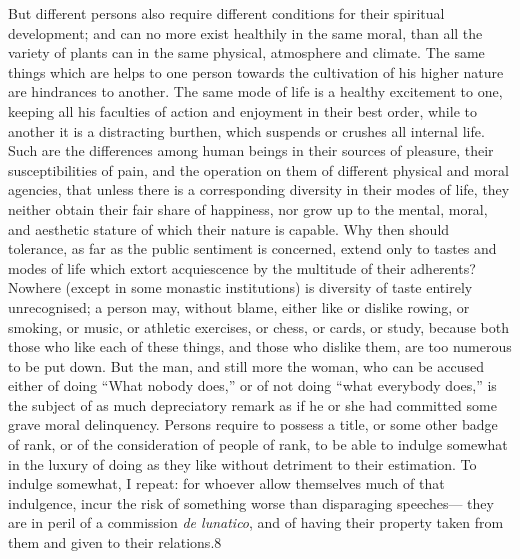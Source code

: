 \documentclass[11pt,openany]{book}
\begin{document}
But different persons also require different conditions for their spiritual development; and can no more exist healthily in the same moral, than all the variety of plants can in the same physical, atmosphere and climate. The same things which are helps to one person towards the cultivation of his higher nature are hindrances to another. The same mode of life is a healthy excitement to one, keeping all his faculties of action and enjoyment in their best order, while to another it is a distracting burthen, which suspends or crushes all internal life. Such are the differences among human beings in their sources of pleasure, their susceptibilities of pain, and the operation on them of different physical and moral agencies, that unless there is a corresponding diversity in their modes of life, they neither obtain their fair share of happiness, nor grow up to the mental, moral, and aesthetic stature of which their nature is capable. Why then should tolerance, as far as the public sentiment is concerned, extend only to tastes and modes of life which extort acquiescence by the multitude of their adherents? Nowhere (except in some monastic institutions) is diversity of taste entirely unrecognised; a person may, without blame, either like or dislike rowing, or smoking, or music, or athletic exercises, or chess, or cards, or study, because both those who like each of these things, and those who dislike them, are too numerous to be put down. But the man, and still more the woman, who can be accused either of doing ``What nobody does,'' or of not doing ``what everybody does,'' is the subject of as much depreciatory remark as if he or she had committed some grave moral delinquency. Persons require to possess a title, or some other badge of rank, or of the consideration of people of rank, to be able to indulge somewhat in the luxury of doing as they like without detriment to their estimation. To indulge somewhat, I repeat: for whoever allow themselves much of that indulgence, incur the risk of something worse than disparaging speeches--- they are in peril of a commission \emph{de lunatico}, and of having their property taken from them and given to their relations.8
\end{document}
